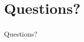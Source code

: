 \documentclass{beamer}
\begin{document}
\section{Questions?}
\begin{frame}\frametitle{} 
\begin{center}
\Huge Questions?
\end{center}
\end{frame}
\end{document}
